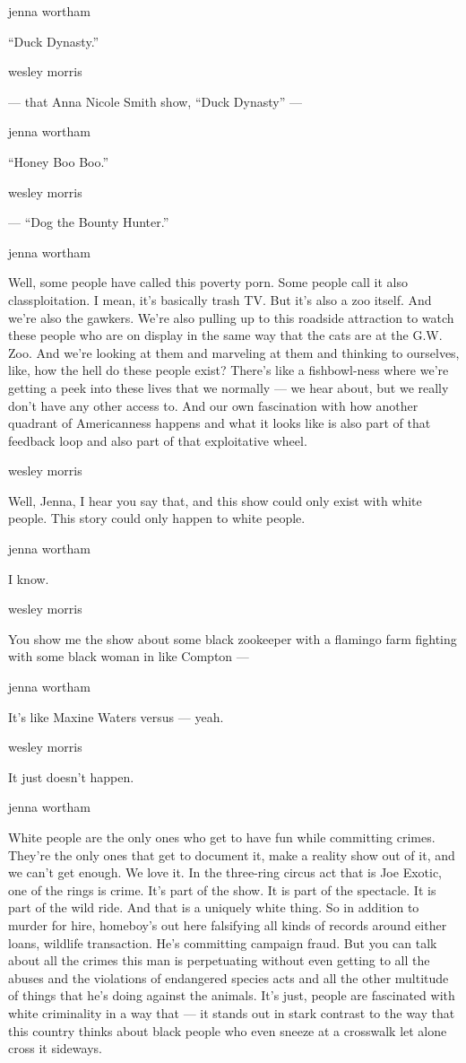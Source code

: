jenna wortham

``Duck Dynasty.''

wesley morris

--- that Anna Nicole Smith show, ``Duck Dynasty'' ---

jenna wortham

``Honey Boo Boo.''

wesley morris

--- ``Dog the Bounty Hunter.''

jenna wortham

Well, some people have called this poverty porn. Some people call it
also classploitation. I mean, it's basically trash TV. But it's also a
zoo itself. And we're also the gawkers. We're also pulling up to this
roadside attraction to watch these people who are on display in the same
way that the cats are at the G.W. Zoo. And we're looking at them and
marveling at them and thinking to ourselves, like, how the hell do these
people exist? There's like a fishbowl-ness where we're getting a peek
into these lives that we normally --- we hear about, but we really don't
have any other access to. And our own fascination with how another
quadrant of Americanness happens and what it looks like is also part of
that feedback loop and also part of that exploitative wheel.

wesley morris

Well, Jenna, I hear you say that, and this show could only exist with
white people. This story could only happen to white people.

jenna wortham

I know.

wesley morris

You show me the show about some black zookeeper with a flamingo farm
fighting with some black woman in like Compton ---

jenna wortham

It's like Maxine Waters versus --- yeah.

wesley morris

It just doesn't happen.

jenna wortham

White people are the only ones who get to have fun while committing
crimes. They're the only ones that get to document it, make a reality
show out of it, and we can't get enough. We love it. In the three-ring
circus act that is Joe Exotic, one of the rings is crime. It's part of
the show. It is part of the spectacle. It is part of the wild ride. And
that is a uniquely white thing. So in addition to murder for hire,
homeboy's out here falsifying all kinds of records around either loans,
wildlife transaction. He's committing campaign fraud. But you can talk
about all the crimes this man is perpetuating without even getting to
all the abuses and the violations of endangered species acts and all the
other multitude of things that he's doing against the animals. It's
just, people are fascinated with white criminality in a way that --- it
stands out in stark contrast to the way that this country thinks about
black people who even sneeze at a crosswalk let alone cross it sideways.

